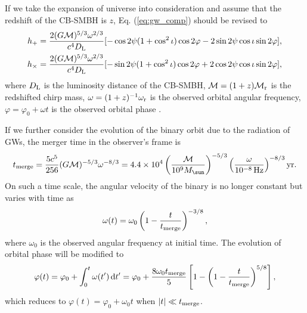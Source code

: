 \documentclass[times,tight]{aastex631}
\begin{document}
If we take the expansion of universe into consideration and assume that the redshift of the CB-SMBH is $z$, Eq. (\ref{eq:gw_comp})
should be revised to
\begin{align}
    h_+ = \frac{2 (G\mathcal{M})^{5/3} \omega^{2/3}}{c^4D_{\rm L}} [-\cos2\psi(1+\cos^2\iota)\cos2\varphi - 2\sin2\psi \cos\iota \sin 2\varphi],
    \nonumber \\
    h_{\times} = \frac{2 (G\mathcal{M})^{5/3} \omega^{2/3}}{c^4D_{\rm L}} [-\sin2\psi(1+\cos^2\iota)\cos2\varphi + 2\cos2\psi \cos\iota \sin 2\varphi],
\end{align}
where $D_{\rm L}$ is the luminosity distance of the CB-SMBH, $\mathcal{M} = (1+z)\mathcal{M}_{\rm r}$ is the redshifted chirp mass, $\omega = (1+z)^{-1}\omega_{\rm r}$ is the observed orbital angular frequency, $\varphi = \varphi_0 + \omega t$ is the observed orbital phase \citep{holz2005}.

If we further consider the evolution of the binary orbit due to the radiation of GWs, the merger time in the observer's frame is
\begin{equation}
    t_{\rm merge} = \frac{5c^5}{256} (G\mathcal{M})^{-5/3} \omega^{-8/3} = \num{4.4e4} \left(\frac{\mathcal{M}}{\num{e9}M_{\sun}}\right)^{-5/3} \left(\frac{\mathcal{\omega}}{\SI{e-8}{\hertz}}\right)^{-8/3} \si{yr}.
\end{equation}
On such a time scale, the angular velocity of the binary is no longer constant but varies with time as
\begin{equation}
    \omega(t) = \omega_0\left(1-\frac{t}{t_{\rm merge}}\right)^{-3/8},
\end{equation}
where $\omega_0$ is the observed angular frequency at initial time.
The evolution of orbital phase will be modified to
\begin{equation}
    \varphi(t) = \varphi_0 + \int_0^t \omega(t') \dd{t'} = 
    \varphi_0 + \frac{8\omega_0 t_{\rm merge}}{5} \left[1-\left(1-\frac{t}{t_{\rm merge}}\right)^{5/8}\right],
\end{equation}
which reduces to $\varphi(t) = \varphi_0 + \omega_0 t$ when $|t| \ll t_{\rm merge}$.
\end{document}
